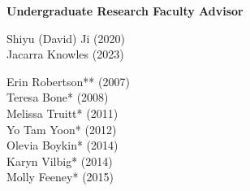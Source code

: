 \noindent \textbf{Undergraduate Research Faculty Advisor} 

\begin{multicols}{2}
    \noindent
    Shiyu (David) Ji (2020) \\
    Jacarra Knowles (2023)
\end{multicols}

\begin{multicols}{2}
    \noindent
    Erin Robertson\textcolor{uclablue}{**}  (2007) \\
    Teresa Bone\textcolor{uclablue}{*} (2008) \\
    Melissa Truitt\textcolor{uclablue}{*} (2011)  \\
    Yo Tam Yoon\textcolor{uclablue}{*} (2012) \\
    Olevia Boykin\textcolor{uclablue}{*} (2014) \\
    Karyn Vilbig\textcolor{uclablue}{*} (2014) \\ 
    Molly Feeney\textcolor{uclablue}{*} (2015) 

\end{multicols}






